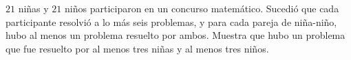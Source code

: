 $21$ niñas y $21$ niños participaron en un concurso matemático. Sucedió que cada participante resolvió a lo más seis problemas, y para cada pareja de niña-niño, hubo al menos un problema resuelto por ambos. Muestra que hubo un problema que fue resuelto por al menos tres niñas y al menos tres niños.